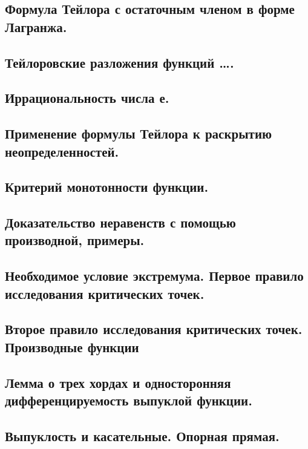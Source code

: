\documentclass[12pt, a4paper]{article}
\begin{document}
\subsection{Формула Тейлора с остаточным членом в форме Лагранжа.}

\subsection{Тейлоровские разложения функций ….} %


\subsection{Иррациональность числа е.}

\subsection{Применение формулы Тейлора к раскрытию неопределенностей.}

\subsection{Критерий монотонности функции.}

\subsection{Доказательство неравенств с помощью производной, примеры.}

\subsection{Необходимое условие экстремума. Первое правило исследования критических точек.}

\subsection{Второе правило исследования критических точек. Производные функции}

\subsection{Лемма о трех хордах и односторонняя дифференцируемость выпуклой функции.}

\subsection{Выпуклость и касательные. Опорная прямая.}
\end{document}
